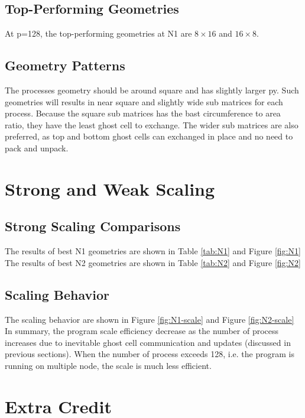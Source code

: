 \documentclass[12pt]{article}
\begin{document}
\subsection{Top-Performing Geometries}
At p=128, the top-performing geometries at N1 are $8\times 16$ and $16 \times 8$.

\subsection{Geometry Patterns}
The processes geometry should be around square and has slightly larger py.
Such geometries will results in near square and slightly wide sub matrices for each process.
Because the square sub matrices has the bast circumference to area ratio, 
they have the least ghost cell to exchange.
The wider sub matrices are also preferred, 
as top and bottom ghost cells can exchanged in place and no need to pack and unpack.

\section{Strong and Weak Scaling}

\subsection{Strong Scaling Comparisons}
The results of best N1 geometries are shown in Table \ref{tab:N1} and Figure \ref{fig:N1}
The results of best N2 geometries are shown in Table \ref{tab:N2} and Figure \ref{fig:N2}

\subsection{Scaling Behavior}
The scaling behavior are shown in Figure \ref{fig:N1-scale} and Figure \ref{fig:N2-scale}
In summary, the program scale efficiency decrease as the number of process increases due to inevitable ghost cell communication and updates (discussed in previous sections).
When the number of process exceeds 128, i.e. the program is running on multiple node, the scale is much less efficient.

\section{Extra Credit}
\end{document}
